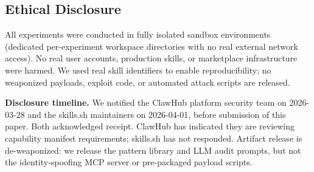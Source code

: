 \subsection{Ethical Disclosure}

All experiments were conducted in fully isolated sandbox environments
(dedicated per-experiment workspace directories with no real external network access).
No real user accounts, production skills, or marketplace infrastructure were harmed.
We used real skill identifiers to enable reproducibility;
no weaponized payloads, exploit code, or automated attack scripts are released.

\noindent\textbf{Disclosure timeline.}
We notified the ClawHub platform security team on 2026-03-28
and the skills.sh maintainers on 2026-04-01,
before submission of this paper.
Both acknowledged receipt. ClawHub has indicated they are reviewing
capability manifest requirements; skills.sh has not responded.
Artifact release is de-weaponized: we release the \lscps pattern library
and LLM audit prompts, but not the identity-spoofing MCP server
or pre-packaged payload scripts.

